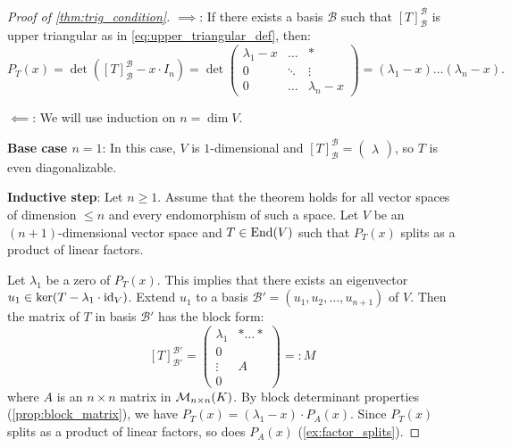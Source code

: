 \begin{proof}[Proof of \cref{thm:trig_condition}]
  $\implies$: If there exists a basis $\mathcal{B}$ such that $[T]_{\mathcal{B}}^{\mathcal{B}}$ is upper triangular as in \eqref{eq:upper_triangular_def}, then:
  \[ P_T(x) = \det([T]_{\mathcal{B}}^{\mathcal{B}} - x \cdot I_n) = \det \begin{pmatrix} \lambda_1 - x & \dots & * \\ 0 & \ddots & \vdots \\ 0 & \dots & \lambda_n - x \end{pmatrix} = (\lambda_1 - x) \dots (\lambda_n - x). \]
  
  \noindent
  $\impliedby$: We will use induction on $n = \dim V$.

  \textbf{Base case $n=1$}: In this case, $V$ is $1$-dimensional and $[T]_{\mathcal{B}}^{\mathcal{B}} = \left(\begin{smallmatrix} \lambda \end{smallmatrix}\right)$, so $T$ is even diagonalizable.

  \textbf{Inductive step}: Let $n \ge 1$. Assume that the theorem holds for all vector spaces of dimension $\le n$ and every endomorphism of such a space.
  Let $V$ be an $(n+1)$-dimensional vector space and $T \in \operatorname{End}(V)$ such that $P_T(x)$ splits as a product of linear factors.

  Let $\lambda_1$ be a zero of $P_T(x)$. This implies that there exists an eigenvector $u_1 \in \ker(T - \lambda_1 \cdot \operatorname{id}_V)$.
  Extend $u_1$ to a basis $\mathcal{B}' = (u_1, u_2, \dots, u_{n+1})$ of $V$.
  Then the matrix of $T$ in basis $\mathcal{B}'$ has the block form:
  \begin{equation} \label{eq:M_block}
    [T]_{\mathcal{B}'}^{\mathcal{B}'} = \left(\begin{array}{c|c} \lambda_1 & * \dots * \\ \hline 0 & \\ \vdots & A \\ 0 & \end{array}\right) =: M
  \end{equation}
  where $A$ is an $n \times n$ matrix in $\mathcal{M}_{n \times n}(K)$.
  By block determinant properties (\cref{prop:block_matrix}), we have $P_T(x) = (\lambda_1 - x) \cdot P_A(x)$.
  Since $P_T(x)$ splits as a product of linear factors, so does $P_A(x)$ (\cref{ex:factor_splits}).


\end{proof}
